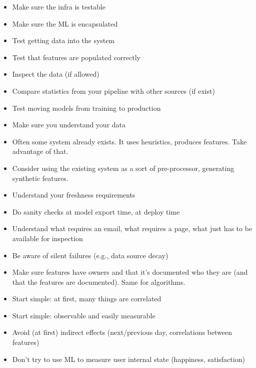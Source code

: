 
\begin{itemize}
\item Make sure the infra is testable
\item Make sure the ML is encapsulated
\item Test getting data into the system
\item Test that features are populated correctly
\item Inspect the data (if allowed)
\item Compare statistics from your pipeline with other sources (if
  exist)
\item Test moving models from training to production
\item Make sure you understand your data
\end{itemize}


\begin{itemize}
\item Often some system already exists.  It uses heuristics, produces
  features.  Take advantage of that.
\item Consider using the existing system as a sort of pre-processor,
  generating synthetic features.
\end{itemize}


\begin{itemize}
\item Understand your freshness requirements
\item Do sanity checks at model export time, at deploy time
\item Understand what requires an email, what requires a page, what
  just has to be available for inspection
\item Be aware of silent failures (e.g., data source decay)
\item Make sure features have owners and that it's documented who they
  are (and that the features are documented).  Same for algorithms.
\end{itemize}


\begin{itemize}
\item Start simple: at first, many things are correlated
\item Start simple: observable and easily measurable
\item Avoid (at first) indirect effects (next/previous day,
  correlations between features)
\item Don't try to use ML to measure user internal state (happiness,
  satisfaction)
\end{itemize}

